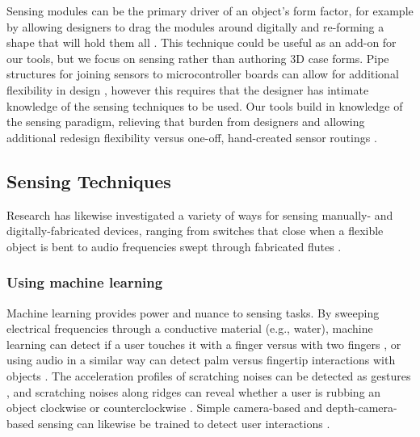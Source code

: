     Sensing modules can be the primary driver of an object's form factor, for example by allowing designers to drag the modules around digitally and re-forming a shape that will hold them all \cite{weichel-enclosed}. This technique could be useful as an add-on for our tools, but we focus on sensing rather than authoring 3D case forms. Pipe structures for joining sensors to microcontroller boards can allow for additional flexibility in design \cite{savage-sot}, however this requires that the designer has intimate knowledge of the sensing techniques to be used. Our tools build in knowledge of the sensing paradigm, relieving that burden from designers and allowing additional redesign flexibility versus one-off, hand-created sensor routings \cite{navarrette-gps, park-microchannels}.

\subsection{Sensing Techniques}

    Research has likewise investigated a variety of ways for sensing manually- and digitally-fabricated devices, ranging from switches that close when a flexible object is bent \cite{slyper-structure} to audio frequencies swept through fabricated flutes \cite{laput-acoustruments}.

    \subsubsection{Using machine learning}
        Machine learning provides power and nuance to sensing tasks. By sweeping electrical frequencies through a conductive material (e.g., water), machine learning can detect if a user touches it with a finger versus with two fingers \cite{sato-touche}, or using audio in a similar way can detect palm versus fingertip interactions with objects \cite{ono-touchandactivate}. The acceleration profiles of scratching noises can be detected as gestures \cite{harrison-scratchinput}, and scratching noises along ridges can reveal whether a user is rubbing an object clockwise or counterclockwise \cite{murray-smith-stane}. Simple camera-based and depth-camera-based sensing can likewise be trained to detect user interactions  \cite{fails-crayons,holman-sketchspace,klemmer-papiermache,macintyre-DART}.
        
